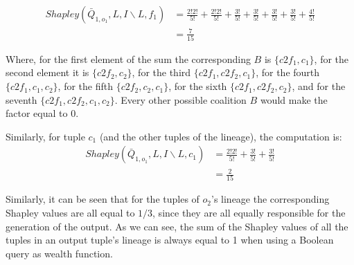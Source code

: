 \[
\begin{array}{ll}
	Shapley(\bar{Q}_{1, o_1}, L, I \backslash L, f_1) & = \frac{2!2!}{5!} + \frac{2!2!}{5!} + \frac{3!}{5!} + \frac{3!}{5!}  + \frac{3!}{5!} + \frac{3!}{5!} + \frac{4!}{5!}\\
	& = \frac{7}{15}
\end{array}
\]

Where, for the first element of the sum the corresponding $B$ is $\{c2f_1, c_1\}$, for the second element it is $\{c2f_2, c_2\}$, for the third $\{c2f_1, c2f_2, c_1\}$, for the fourth  $\{c2f_1, c_1, c_2\}$, for the fifth  $\{c2f_2, c_2, c_1\}$, for the sixth  $\{c2f_1, c2f_2, c_2\}$, and for the seventh $\{c2f_1, c2f_2, c_1, c_2\}$. Every other possible coalition $B$ would make the factor equal to $0$.

Similarly, for tuple $c_1$ (and the other tuples of the lineage), the computation is:
\[
\begin{array}{ll}
	Shapley(\bar{Q}_{1, o_1}, L, I \backslash L, c_1) & = \frac{2!2!}{5!} + \frac{3!}{5!} + \frac{3!}{5!}\\
	& = \frac{2}{15}
\end{array}
\]

Similarly, it can be seen that for the tuples of $o_2$'s lineage the corresponding Shapley values are all equal to $1/3$, since they are all equally responsible for the generation of the output.
As we can see, the sum of the Shapley values of all the tuples in an output tuple's lineage is always equal to 1 when using a Boolean query as wealth function. 




